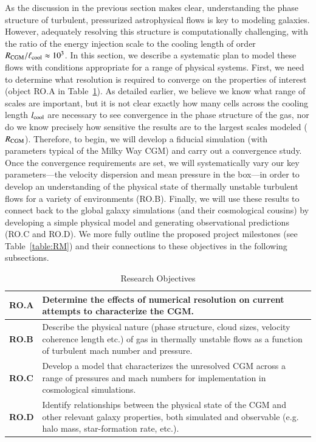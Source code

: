 \documentclass[11pt,letterpaper,english]{article}
\begin{document}
As the discussion in the previous section makes clear, understanding the phase structure of turbulent, pressurized astrophysical flows is key to modeling galaxies. However, adequately resolving this structure is computationally challenging, with the ratio of the energy injection scale to the cooling length of order $R_{\rm CGM}/\ell_{\rm cool} \approx 10^3$.  In this section, we describe a systematic plan to model these flows with conditions appropriate for a range of physical systems. First, we need to determine what resolution is required to converge on the properties of interest (object RO.A in Table~\ref{table:RO}).  As detailed earlier, we believe we know what range of scales are important, but it is not clear exactly how many cells across the cooling length $l_{\rm cool}$ are necessary to see convergence in the phase structure of the gas, nor do we know precisely how sensitive the results are to the largest scales modeled ($R_{\rm CGM}$).  Therefore, to begin, we will develop a fiducial simulation (with parameters typical of the Milky Way CGM) and carry out a convergence study.  Once the convergence requirements are set, we will systematically vary our key parameters---the velocity dispersion and mean pressure in the box---in order to develop an understanding of the physical state of thermally unstable turbulent flows for a variety of environments (RO.B). Finally, we will use these results to connect back to the global galaxy simulations (and their cosmological cousins) by developing a simple physical model and generating observational predictions (RO.C and RO.D). We more fully outline the proposed project milestones (see Table~\ref{table:RM}) and their connections to these objectives in the following subsections.


\begin{table}[h]
\caption{Research Objectives}
\label{table:RO}
\begin{tabular}{|l|p{5.8in}|}
\hline
\textbf{RO.A} & Determine the effects of numerical resolution on current attempts to characterize the CGM. \\ \hline
\textbf{RO.B} & Describe the physical nature (phase structure, cloud sizes, velocity coherence length etc.)
of gas in thermally unstable flows as a function of turbulent mach number and pressure. \\ \hline
\textbf{RO.C} & Develop a model that characterizes the unresolved CGM across a range of
pressures and mach numbers for implementation in cosmological simulations. \\ \hline
\textbf{RO.D} & Identify relationships between the physical state of the CGM and other relevant galaxy
properties, both simulated and observable (e.g. halo mass, star-formation rate, etc.). \\
\hline
\end{tabular}
\end{table}
\end{document}
